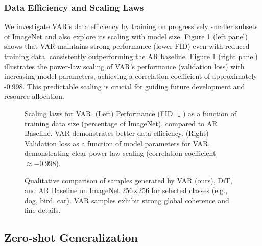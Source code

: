 \documentclass{article}
\begin{document}
\subsubsection{Data Efficiency and Scaling Laws}
\label{ssec:scaling_laws}
We investigate VAR's data efficiency by training on progressively smaller subsets of ImageNet and also explore its scaling with model size. Figure \ref{fig:scaling_laws} (left panel) shows that VAR maintains strong performance (lower FID) even with reduced training data, consistently outperforming the AR baseline. Figure \ref{fig:scaling_laws} (right panel) illustrates the power-law scaling of VAR's performance (validation loss) with increasing model parameters, achieving a correlation coefficient of approximately -0.998. This predictable scaling is crucial for guiding future development and resource allocation.

\begin{figure}[htbp]
\centering
\fbox{\rule{0.48\textwidth}{6cm}} %
\hfill
\fbox{\rule{0.48\textwidth}{6cm}} %
\caption{Scaling laws for VAR. (Left) Performance (FID $\downarrow$) as a function of training data size (percentage of ImageNet), compared to AR Baseline. VAR demonstrates better data efficiency. (Right) Validation loss as a function of model parameters for VAR, demonstrating clear power-law scaling (correlation coefficient $\approx -0.998$).}
\label{fig:scaling_laws}
\end{figure}

\begin{figure}[htbp] %
\centering
\fbox{\rule{0.9\textwidth}{8cm}}
\caption{Qualitative comparison of samples generated by VAR (ours), DiT, and AR Baseline on ImageNet 256$\times$256 for selected classes (e.g., dog, bird, car). VAR samples exhibit strong global coherence and fine details.}
\label{fig:qualitative_samples_placeholder}
\end{figure}


\subsection{Zero-shot Generalization}
\label{ssec:zero_shot}
\end{document}
